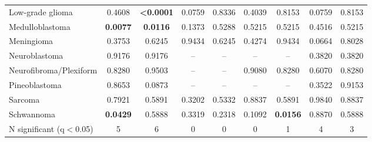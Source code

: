 \begin{table}[H]
{\begin{tabular}{lcccccccc}
Low-grade glioma & 0.4608 & \textbf{<0.0001} & 0.0759 & 0.8336 & 0.4039 & 0.8153 & 0.0759 & 0.8153 \\
Medulloblastoma & \textbf{0.0077} & \textbf{0.0116} & 0.1373 & 0.5288 & 0.5215 & 0.5215 & 0.4516 & 0.5215 \\
Meningioma & 0.3753 & 0.6245 & 0.9434 & 0.6245 & 0.4274 & 0.9434 & 0.0664 & 0.8028 \\
Neuroblastoma & 0.9176 & 0.9176 & -- & -- & -- & -- & 0.3820 & 0.3820 \\
Neurofibroma/Plexiform & 0.8280 & 0.9503 & -- & -- & 0.9080 & 0.8280 & 0.6070 & 0.8280 \\
Pineoblastoma & 0.8653 & 0.0873 & -- & -- & -- & -- & 0.3522 & 0.9153 \\
Sarcoma & 0.7921 & 0.5891 & 0.3202 & 0.5332 & 0.8837 & 0.5891 & 0.9840 & 0.8837 \\
Schwannoma & \textbf{0.0429} & 0.5888 & 0.3319 & 0.2318 & 0.1092 & \textbf{0.0156} & 0.8870 & 0.5888 \\
\midrule
N significant (q$<$0.05) & 5 & 6 & 0 & 0 & 0 & 1 & 4 & 3 \\
\bottomrule
\end{tabular}}
\end{table}
